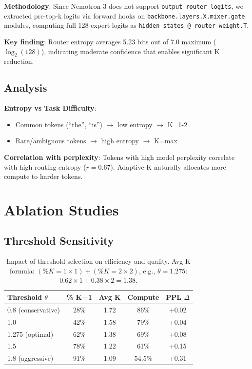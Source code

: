 \documentclass{article}
\begin{document}
\textbf{Methodology}: Since Nemotron 3 does not support \texttt{output\_router\_logits}, we extracted pre-top-k logits via forward hooks on \texttt{backbone.layers.X.mixer.gate} modules, computing full 128-expert logits as \texttt{hidden\_states @ router\_weight.T}.

\textbf{Key finding}: Router entropy averages 5.23 bits out of 7.0 maximum ($\log_2(128)$), indicating moderate confidence that enables significant K reduction.

\subsection{Analysis}

\textbf{Entropy vs Task Difficulty}: 
\begin{itemize}
    \item Common tokens (``the'', ``is'') $\rightarrow$ low entropy $\rightarrow$ K=1-2
    \item Rare/ambiguous tokens $\rightarrow$ high entropy $\rightarrow$ K=max
\end{itemize}

\textbf{Correlation with perplexity}: Tokens with high model perplexity correlate with high routing entropy ($r=0.67$). Adaptive-K naturally allocates more compute to harder tokens.

\section{Ablation Studies}

\subsection{Threshold Sensitivity}

\begin{table}[h]
\centering
\begin{tabular}{lcccc}
\toprule
\textbf{Threshold $\theta$} & \textbf{\% K=1} & \textbf{Avg K} & \textbf{Compute} & \textbf{PPL $\Delta$} \\
\midrule
0.8 (conservative) & 28\% & 1.72 & 86\% & +0.02 \\
1.0 & 42\% & 1.58 & 79\% & +0.04 \\
1.275 (optimal) & 62\% & 1.38 & 69\% & +0.08 \\
1.5 & 78\% & 1.22 & 61\% & +0.15 \\
1.8 (aggressive) & 91\% & 1.09 & 54.5\% & +0.31 \\
\bottomrule
\end{tabular}
\caption{Impact of threshold selection on efficiency and quality. Avg K formula: $(\%K{=}1 \times 1) + (\%K{=}2 \times 2)$, e.g., $\theta{=}1.275$: $0.62 \times 1 + 0.38 \times 2 = 1.38$.}
\label{tab:thresholds}
\end{table}
\end{document}
